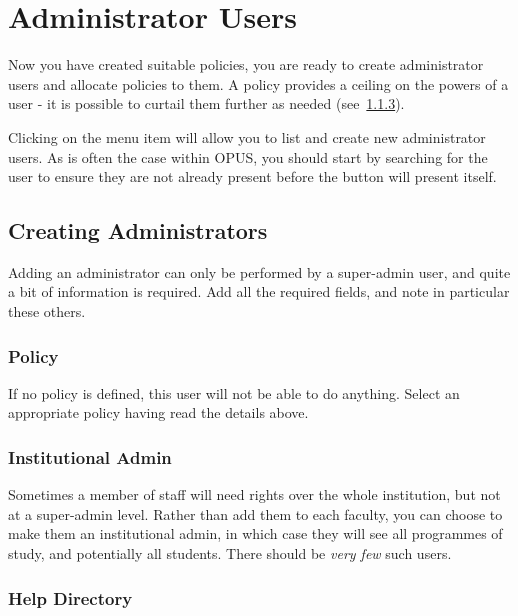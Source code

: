 \documentclass[12 pt]{book}
\begin{document}
\section{Administrator Users}

Now you have created suitable policies, you are ready to create administrator
users and allocate policies to them. A policy provides a ceiling on the powers
of a user - it is possible to curtail them further as needed (see~\ref{}).

Clicking on the  menu item will 
allow you to list and create new administrator users. As is often the case 
within OPUS, you should start by searching for the user to ensure they are not
already present before the  button will present itself.

\subsection{Creating Administrators}

Adding an administrator can only be performed by a super-admin user, and quite
a bit of information is required. Add all the required fields, and note in
particular these others.

\subsubsection{Policy}

If no policy is defined, this user will not be able to do anything. Select an
appropriate policy having read the details above.

\subsubsection{Institutional Admin}

Sometimes a member of staff will need rights over the whole institution, but
not at a super-admin level. Rather than add them to each faculty, you can
choose to make them an institutional admin, in which case they will see all
programmes of study, and potentially all students. There should be 
\emph{very few} such users.

\subsubsection{Help Directory}
\end{document}
